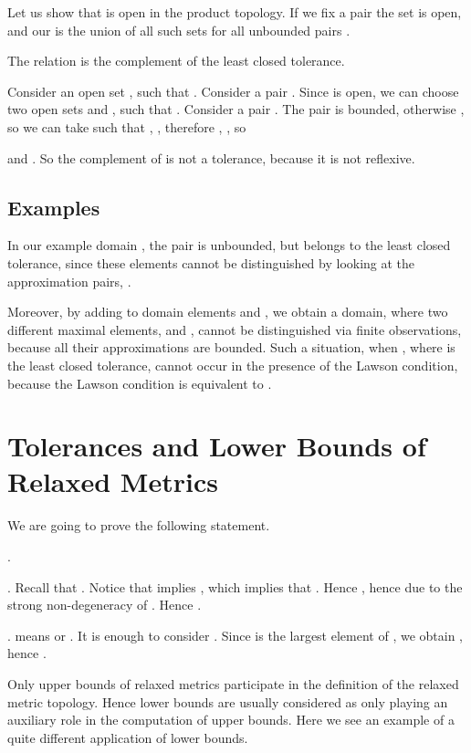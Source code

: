 Let us show that  is open in
the product topology. If we fix a pair  
the set  is open, and our
 is the union of all such sets for all unbounded pairs 
.

\begin{theorem}
The relation  is the complement of the least closed tolerance.
\end{theorem}

\Proof 
Consider an open set , such that
. Consider a pair 
. Since  is
open, we can choose two open sets  and , such that
. 
Consider a pair . 
The pair  is bounded, otherwise
, 
so we can take  such that , , therefore , , so 

and . 
So the complement of  is not a tolerance, because it
is not
reflexive.
\eproof

\subsection{Examples}

In our example domain , the pair  is
unbounded, but belongs to the least closed tolerance, since
these elements cannot be distinguished by looking at the approximation
pairs,  .

Moreover, by adding to domain  elements
  and ,
we obtain a domain, where two different maximal elements,  and
, cannot be distinguished 
via finite observations, because all their
approximations are bounded.
Such a situation, when ,
where  is the least closed tolerance, cannot
occur in the presence of the Lawson condition, because the Lawson condition
is equivalent to .

\section{Tolerances and Lower Bounds of Relaxed Metrics}\label{sec:lowerb}

We are going to prove the following statement.

\begin{theorem}
.
\end{theorem}

\Proof
. Recall that
.
Notice that
 implies , which implies
that . Hence , hence  due to the strong
non-degeneracy of . Hence .

.  means  or
. It is enough to consider
. Since  is the largest element
of , we obtain , hence .
\eproof

Only upper bounds of relaxed metrics participate in the definition
of the relaxed metric topology. Hence lower bounds are usually considered
as only playing an auxiliary role in the computation of upper bounds.
Here we see an example of a quite different 
application of lower bounds.

